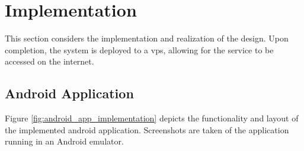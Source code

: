 \section{Implementation}
This section considers the implementation and realization of the design.
Upon completion, the system is deployed to a \Ac{vps}, allowing for the service to be accessed on the internet.

\subsection{Android Application}
Figure \ref{fig:android_app_implementation} depicts the functionality and layout of the implemented android application.
Screenshots are taken of the application running in an Android emulator.

\begin{figure}[H]
\centering
    \\
\end{figure}

